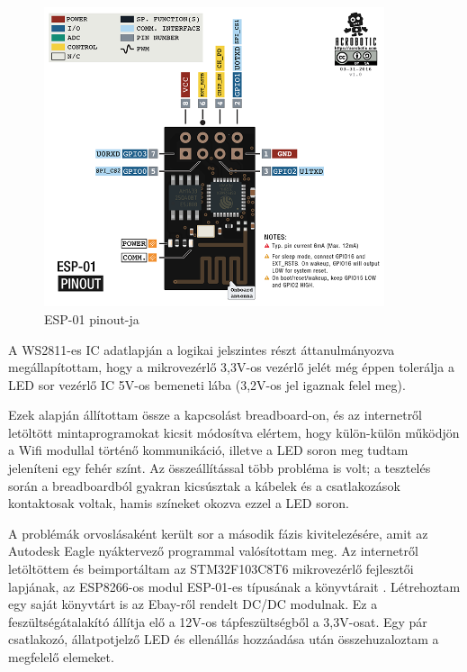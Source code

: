 \documentclass[../main.tex]{subfiles}
\begin{document}
        \begin{figure}[h!]
            \centering
                \includegraphics[width=10cm]{resources/pcb_res/esp8266_esp01_pinout.png}
            \caption{ESP-01 pinout-ja\cite{esp_pinout}}
            \label{fig:eps01_pinout}
        \end{figure}
        
        A WS2811-es IC adatlapján a logikai jelszintes részt áttanulmányozva megállapítottam, hogy a mikrovezérlő 3,3V-os vezérlő jelét még éppen tolerálja a LED sor vezérlő IC 5V-os bemeneti lába (3,2V-os jel igaznak felel meg). 
        
        Ezek alapján állítottam össze a kapcsolást breadboard-on, és az internetről letöltött mintaprogramokat kicsit módosítva elértem, hogy külön-külön működjön a Wifi modullal történő kommunikáció, illetve a LED soron meg tudtam jeleníteni egy fehér színt. Az összeállítással több probléma is volt; a tesztelés során a breadboardból gyakran kicsúsztak a kábelek és a csatlakozások kontaktosak voltak, hamis színeket okozva ezzel a LED soron. 
        
        A problémák orvoslásaként került sor a második fázis kivitelezésére, amit az Autodesk Eagle nyáktervező programmal valósítottam meg. Az internetről letöltöttem és beimportáltam az STM32F103C8T6 mikrovezérlő fejlesztői lapjának, az ESP8266-os modul ESP-01-es típusának a könyvtárait \citep{armMbed}\cite{esp_eagle_lib}. Létrehoztam egy saját könyvtárt is az Ebay-ről rendelt DC/DC modulnak. Ez a feszültségátalakító állítja elő a 12V-os tápfeszültségből a 3,3V-osat. Egy pár csatlakozó, állatpotjelző LED és ellenállás hozzáadása után összehuzaloztam a megfelelő elemeket. 
        
\end{document}
